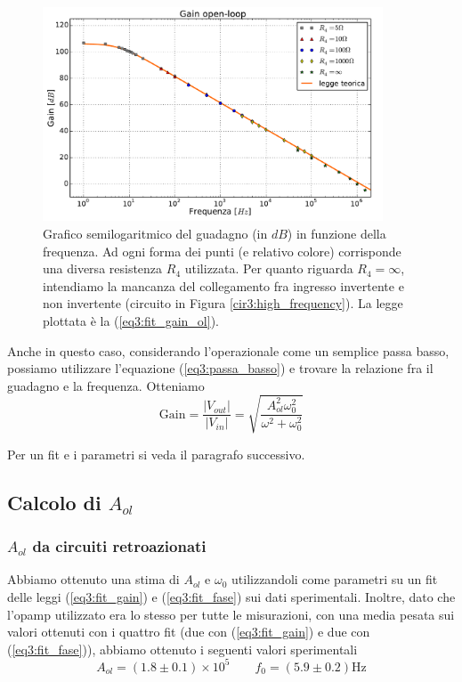 \begin{figure}[h]
	\centering
	\includegraphics[width=0.9\textwidth]{../E03/latex/gol.pdf}
	\caption{Grafico semilogaritmico del guadagno (in $dB$) in funzione della frequenza. Ad ogni forma dei punti (e relativo colore) corrisponde una diversa resistenza $R_4$ utilizzata. Per quanto riguarda $R_4=\infty$, intendiamo la mancanza del collegamento fra ingresso invertente e non invertente (circuito in Figura \ref{cir3:high_frequency}). La legge plottata è la (\ref{eq3:fit_gain_ol}).}
  \label{cir3:gain_open_loop}
\end{figure}

Anche in questo caso, considerando l'operazionale come un semplice passa basso, possiamo utilizzare l'equazione (\ref{eq3:passa_basso}) e trovare la relazione fra il guadagno e la frequenza. Otteniamo
\begin{equation}
\mathrm{Gain}=\frac{|V_{out}|}{|V_{in}|}=\sqrt{\frac{A_{ol}^2 \omega_0^2}{\omega^2 + \omega_0^2}}
\label{eq3:fit_gain_ol}
\end{equation}

Per un fit e i parametri si veda il paragrafo successivo.

\newpage
\subsection{Calcolo di $A_{ol}$}
\label{par3:A_ol}

\subsubsection{$A_{ol}$ da circuiti retroazionati}

Abbiamo ottenuto una stima di $A_{ol}$ e $\omega_0$ utilizzandoli come parametri su un fit delle leggi (\ref{eq3:fit_gain}) e (\ref{eq3:fit_fase}) sui dati sperimentali.
Inoltre, dato che l'opamp utilizzato era lo stesso per tutte le misurazioni, con una media pesata sui valori ottenuti con i quattro fit (due con (\ref{eq3:fit_gain}) e due con (\ref{eq3:fit_fase})), abbiamo ottenuto i seguenti valori sperimentali
$$A_{ol}=(1.8\pm0.1)\times 10^5 \qquad f_0=(5.9\pm0.2)\si{\hertz}$$

